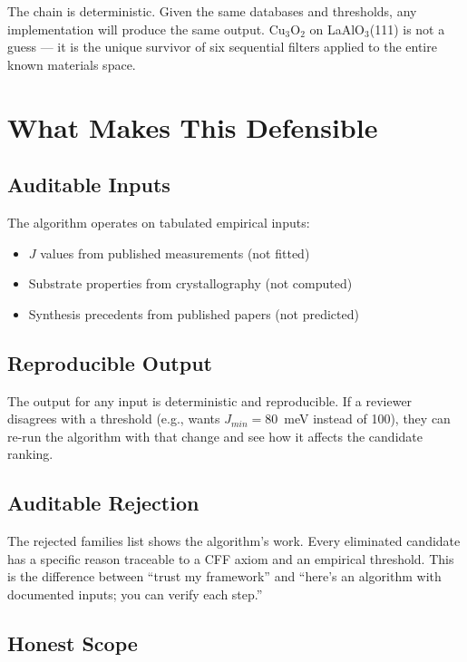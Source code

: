 \documentclass[11pt, a4paper]{article}
\begin{document}
The chain is deterministic. Given the same databases and
thresholds, any implementation will produce the same output.
Cu$_3$O$_2$ on LaAlO$_3$(111) is not a guess --- it is the unique
survivor of six sequential filters applied to the entire known
materials space.

\section{What Makes This Defensible}

\subsection{Auditable Inputs}

The algorithm operates on tabulated empirical inputs:
\begin{itemize}[nosep]
  \item $J$ values from published measurements (not fitted)
  \item Substrate properties from crystallography (not computed)
  \item Synthesis precedents from published papers (not predicted)
\end{itemize}

\subsection{Reproducible Output}

The output for any input is deterministic and reproducible. If a
reviewer disagrees with a threshold (e.g., wants $J_{min} = 80$~meV
instead of 100), they can re-run the algorithm with that change
and see how it affects the candidate ranking.

\subsection{Auditable Rejection}

The rejected families list shows the algorithm's work. Every
eliminated candidate has a specific reason traceable to a CFF
axiom and an empirical threshold. This is the difference between
``trust my framework'' and ``here's an algorithm with documented
inputs; you can verify each step.''

\subsection{Honest Scope}
\end{document}
